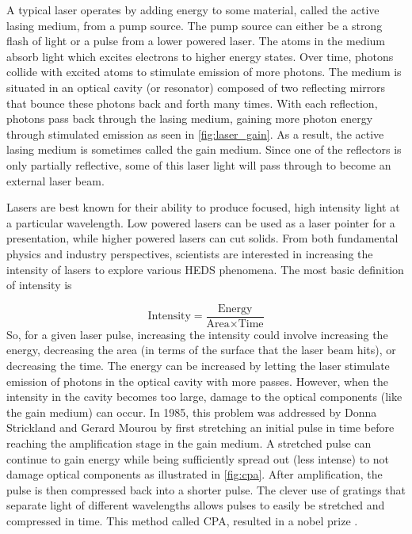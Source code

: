 A typical laser operates by adding energy to some material, called the active lasing medium, from a pump source. The pump source can either be a strong flash of light or a pulse from a lower powered laser. The atoms in the medium absorb light which excites electrons to higher energy states. Over time, photons collide with excited atoms to stimulate emission of more photons. The medium is situated in an optical cavity (or resonator) composed of two reflecting mirrors that bounce these photons back and forth many times. With each reflection, photons pass back through the lasing medium, gaining more photon energy through stimulated emission as seen in \autoref{fig:laser_gain}. As a result, the active lasing medium is sometimes called the gain medium. Since one of the reflectors is only partially reflective, some of this laser light will pass through to become an external laser beam.

Lasers are best known for their ability to produce focused, high intensity light at a particular wavelength. Low powered lasers can be used as a laser pointer for a presentation, while higher powered lasers can cut solids. From both fundamental physics and industry perspectives, scientists are interested in increasing the intensity of lasers to explore various \gls{HEDS} phenomena. The most basic definition of intensity is

\begin{equation}
	\text{Intensity} = \frac{\text{Energy}}{\text{Area} \times \text{Time}}	
\end{equation}
So, for a given laser pulse, increasing the intensity could involve increasing the energy, decreasing the area (in terms of the surface that the laser beam hits), or decreasing the time. The energy can be increased by letting the laser stimulate emission of photons in the optical cavity with more passes. However, when the intensity in the cavity becomes too large, damage to the optical components (like the gain medium) can occur. In 1985, this problem was addressed by Donna Strickland and Gerard Mourou \cite{Strickland_1985_Optics} by first stretching an initial pulse in time before reaching the amplification stage in the gain medium. A stretched pulse can continue to gain energy while being sufficiently spread out (less intense) to not damage optical components as illustrated in 
\autoref{fig:cpa}. After amplification, the pulse is then compressed back into a shorter pulse. The clever use of gratings that separate light of different wavelengths allows pulses to easily be stretched and compressed in time. This method called \gls{CPA}, resulted in a nobel prize \cite{Nobel_2018}.

